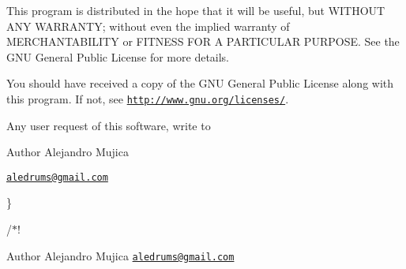 This program is distributed in the hope that it will be useful, but W\+I\+T\+H\+O\+UT A\+NY W\+A\+R\+R\+A\+N\+TY; without even the implied warranty of M\+E\+R\+C\+H\+A\+N\+T\+A\+B\+I\+L\+I\+TY or F\+I\+T\+N\+E\+SS F\+OR A P\+A\+R\+T\+I\+C\+U\+L\+AR P\+U\+R\+P\+O\+SE. See the G\+NU General Public License for more details.

You should have received a copy of the G\+NU General Public License along with this program. If not, see \href{http://www.gnu.org/licenses/}{\tt http\+://www.\+gnu.\+org/licenses/}.

Any user request of this software, write to

\begin{DoxyAuthor}{Author}
Alejandro Mujica
\end{DoxyAuthor}
\href{mailto:aledrums@gmail.com}{\tt aledrums@gmail.\+com}

\}

/$\ast$!

\begin{DoxyAuthor}{Author}
Alejandro Mujica  \href{mailto:aledrums@gmail.com}{\tt aledrums@gmail.\+com} 
\end{DoxyAuthor}
